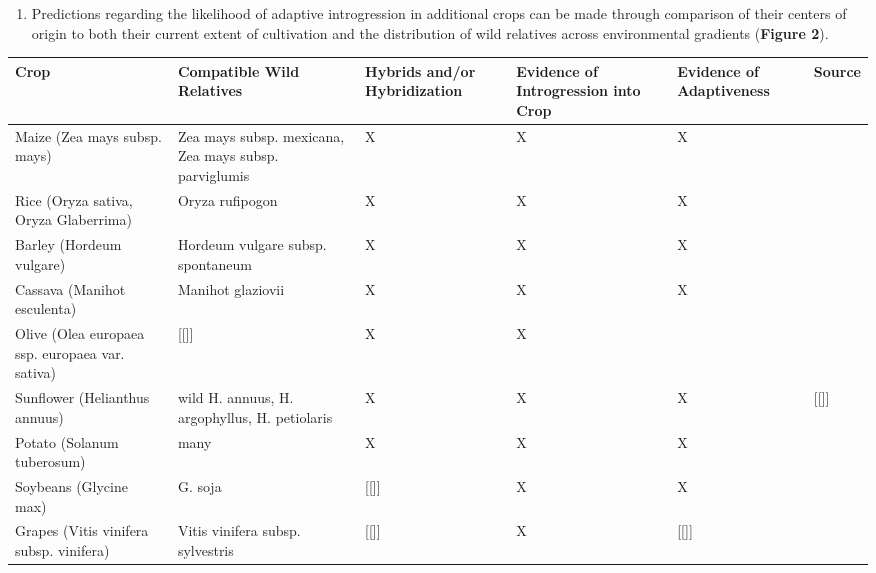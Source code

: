\documentclass[11pt]{article}
\begin{document}
\begin{enumerate}
\begin{enumerate}
	\end{enumerate}
	\item{Predictions regarding the likelihood of adaptive introgression in additional crops can be made through comparison of their centers of origin to both their current extent of cultivation and the distribution of wild relatives across environmental gradients (\textbf{Figure 2}).}
	
	
	

	
	
	
	
	
	
	
	
\end{enumerate}



\begin{table}
\centering
\begin{adjustbox}{width=1\textwidth}
\small
\label{my-label}
\begin{tabular}{llllll}
\hline
Crop & Compatible Wild Relatives & Hybrids and/or Hybridization & Evidence of Introgression into Crop & Evidence of Adaptiveness & Source \\
\hline
Maize (Zea mays subsp. mays) & Zea mays subsp. mexicana, Zea mays subsp. parviglumis & X & X & X & \cite{hufford2013genomic} \\
Rice (Oryza sativa, Oryza Glaberrima) & Oryza rufipogon & X & X & X & \cite{Huang2012} \\
Barley (Hordeum vulgare) & Hordeum vulgare subsp. spontaneum & X & X & X & \cite{Poets2015} \\
Cassava (Manihot esculenta) & Manihot glaziovii & X & X & X & \cite{bredeson2016sequencing} \\
Olive (Olea europaea ssp. europaea var. sativa) & [[]] & X & X & & \cite{diez2015olive} \\
Sunflower (Helianthus annuus) & wild H. annuus, H. argophyllus, H. petiolaris & X & X & X & [[]]\\
Potato (Solanum tuberosum) & many & X & X & X & \cite{johns1986ongoing} \\
Soybeans (Glycine max) & G. soja & [[]] & X & X & \cite{lam2010resequencing} \\
Grapes (Vitis vinifera subsp. vinifera) & Vitis vinifera subsp. sylvestris & [[]] & X & [[]] &  \cite{myles2011genetic} \\
\hline
\end{tabular}
\end{adjustbox}
\end{table}
\end{document}
